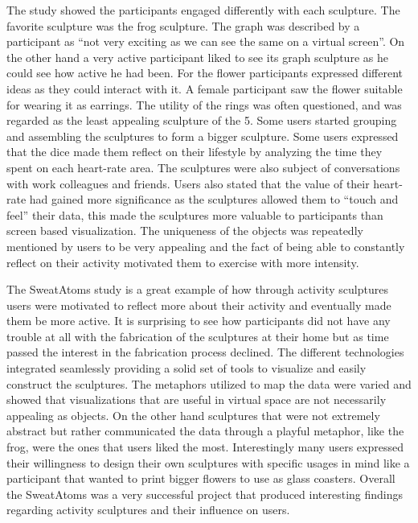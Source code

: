 \documentclass[../medieninformatik-arbeit.tex]{subfiles}
\begin{document}
The study showed the participants engaged differently with each sculpture. The favorite sculpture was the frog sculpture. The graph was described by a participant as ``not very exciting as we can see the same on a virtual screen''. On the other hand a very active participant liked to see its graph sculpture as he could see how active he had been. For the flower participants expressed different ideas as they could interact with it. A female participant saw the flower suitable for wearing it as earrings. The utility of the rings was often questioned, and was regarded as the least appealing sculpture of the 5. Some users started grouping and assembling the sculptures to form a bigger sculpture. Some users expressed that the dice made them reflect on their lifestyle by analyzing the time they spent on each heart-rate area. The sculptures were also subject of conversations with work colleagues and friends. Users also stated that the value of their heart-rate had gained more significance as the sculptures allowed them to ``touch and feel'' their data, this made the sculptures more valuable to participants than screen based visualization. The uniqueness of the objects was repeatedly mentioned by users to be very appealing and the fact of being able to constantly reflect on their activity motivated them to exercise with more intensity.

The SweatAtoms study is a great example of how through activity sculptures users were motivated to reflect more about their activity and eventually made them be more active. It is surprising to see how participants did not have any trouble at all with the fabrication of the sculptures at their home but as time passed the interest in the fabrication process declined. The different technologies integrated seamlessly providing a solid set of tools to visualize and easily construct the sculptures. The metaphors utilized to map the data were varied and showed that visualizations that are useful in virtual space are not necessarily appealing as objects. On the other hand sculptures that were not extremely abstract but rather communicated the data through a playful metaphor, like the frog, were the ones that users liked the most. Interestingly many users expressed their willingness to design their own sculptures with specific usages in mind like a participant that wanted to print bigger flowers to use as glass coasters. Overall the SweatAtoms was a very successful project that produced interesting findings regarding activity sculptures and their influence on users.   
\end{document}

